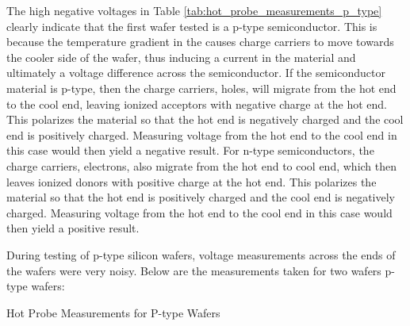 The high negative voltages in Table \ref{tab:hot_probe_measurements_p_type} clearly indicate that the first wafer tested is a p-type semiconductor. This is because the temperature gradient in the causes charge carriers to move towards the cooler side of the wafer, thus inducing a current in the material and ultimately a voltage difference across the semiconductor. If the semiconductor material is p-type, then the charge carriers, holes, will migrate from the hot end to the cool end, leaving ionized acceptors with negative charge at the hot end. This polarizes the material so that the hot end is negatively charged and the cool end is positively charged. Measuring voltage from the hot end to the cool end in this case would then yield a negative result. For n-type semiconductors, the charge carriers, electrons, also migrate from the hot end to cool end, which then leaves ionized donors with positive charge at the hot end. This polarizes the material so that the hot end is positively charged and the cool end is negatively charged. Measuring voltage from the hot end to the cool end in this case would then yield a positive result.

During testing of p-type silicon wafers, voltage measurements across the ends of the wafers were very noisy. Below are the measurements taken for two wafers p-type wafers:

\begin{table}[h!]
	\centering
	\caption{Hot Probe Measurements for P-type Wafers}
	\label{tab:hot_probe_measurements_n_type}
\end{table}